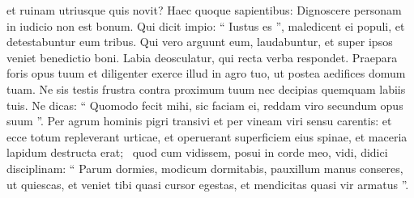 \begin{biblechapter}
\begin{biblechapter}
\begin{biblechapter}
\begin{biblechapter}
\begin{biblechapter}
\begin{biblechapter}
\begin{biblechapter}
\begin{biblechapter}
\begin{biblechapter}
\begin{biblechapter}
\begin{biblechapter}
\begin{biblechapter}
\begin{biblechapter}
\begin{biblechapter}
\begin{biblechapter}
\begin{biblechapter}
\begin{biblechapter}
\begin{biblechapter}
\begin{biblechapter}
\begin{biblechapter}
\begin{biblechapter}
\begin{biblechapter}
\begin{biblechapter}
\begin{biblechapter}
 et ruinam utriusque quis novit?
 \verse Haec quoque sapientibus:
 Dignoscere personam in iudicio non est bonum.
 \verse Qui dicit impio: “ Iustus es ”,
 maledicent ei populi, et detestabuntur eum tribus.
 \verse Qui vero arguunt eum, laudabuntur,
 et super ipsos veniet benedictio boni.
 \verse Labia deosculatur,
 qui recta verba respondet.
 \verse Praepara foris opus tuum
 et diligenter exerce illud in agro tuo,
 ut postea aedifices domum tuam.
 \verse Ne sis testis frustra contra proximum tuum
 nec decipias quemquam labiis tuis.
 \verse Ne dicas: “ Quomodo fecit mihi, sic faciam ei,
 reddam viro secundum opus suum ”.
 \verse Per agrum hominis pigri transivi
 et per vineam viri sensu carentis:
 \verse et ecce totum repleverant urticae,
 et operuerant superficiem eius spinae,
 et maceria lapidum destructa erat; 
 \verse quod cum vidissem, posui in corde meo,
 vidi, didici disciplinam:
 \verse “ Parum dormies, modicum dormitabis,
 pauxillum manus conseres, ut quiescas,
 \verse et veniet tibi quasi cursor egestas,
 et mendicitas quasi vir armatus ”.
 

\end{biblechapter}
\end{biblechapter}
\end{biblechapter}
\end{biblechapter}
\end{biblechapter}
\end{biblechapter}
\end{biblechapter}
\end{biblechapter}
\end{biblechapter}
\end{biblechapter}
\end{biblechapter}
\end{biblechapter}
\end{biblechapter}
\end{biblechapter}
\end{biblechapter}
\end{biblechapter}
\end{biblechapter}
\end{biblechapter}
\end{biblechapter}
\end{biblechapter}
\end{biblechapter}
\end{biblechapter}
\end{biblechapter}
\end{biblechapter}
